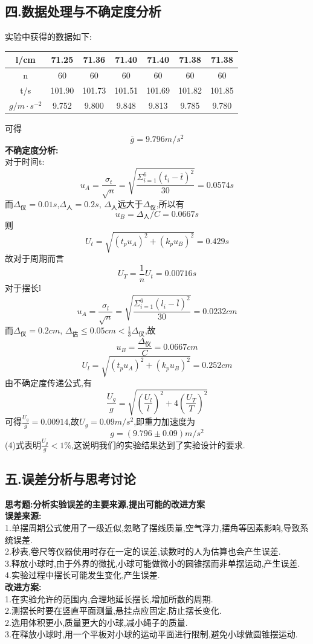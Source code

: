 \documentclass[12pt,a4paper,oneside]{ctexart}
\begin{document}
\subsection*{四.数据处理与不确定度分析}
实验中获得的数据如下:
\begin{center}
    \begin{tabular}{|c|c|c|c|c|c|c|}
    \hline
    l/cm&71.25&71.36&71.40&71.40&71.38&71.38\\
    \hline
    n&60&60&60&60&60&60\\
    \hline
    t/s&101.90&101.73&101.51&101.69&101.82&101.85\\
    \hline
    $g/m\cdot s^{-2}$& 9.752&9.800&9.848&9.813&9.785&9.780\\
    \hline
    \end{tabular}
\end{center}
可得$$\overline{g}=9.796m/s^2$$
\textbf{不确定度分析:}\\
对于时间t:
$$u_A=\frac{\sigma_t}{\sqrt{n}}
=\sqrt{\frac{\Sigma_{i=1}^6(t_i-\overline{t})^2}{30}}=0.0574s$$
而$\Delta_{\mbox{仪}}=0.01s$,$\Delta_{\mbox{人}}=0.2s$,
$\Delta_{\mbox{人}}$远大于$\Delta_{\mbox{仪}}$,所以有
$$u_B=\Delta_{\mbox{人}}/C=0.0667s$$
则$$U_t=\sqrt{(t_pu_A)^2+(k_pu_B)^2}=0.429s$$
故对于周期而言$$U_T=\frac{1}{n}U_t=0.00716s$$
对于摆长l
$$u_A=\frac{\sigma_l}{\sqrt{n}}
=\sqrt{\frac{\Sigma_{i=1}^6(l_i-\overline{l})^2}{30}}=0.0232cm$$
而$\Delta_{\mbox{仪}}=0.2cm$,
$\Delta_{\mbox{估}}\leqslant 0.05cm<\frac{1}{3}\Delta_{\mbox{仪}}$,故
$$u_B=\dfrac{\Delta_{\mbox{仪}}}{C}=0.0667cm$$
$$U_l=\sqrt{(t_pu_A)^2+(k_pu_B)^2}=0.252cm$$
由不确定度传递公式,有
\begin{equation}
    \frac{U_g}{g}=
    \sqrt{\left(\frac{U_l}{l}\right)^2+4\left(\frac{U_T}{T}\right)^2}
\end{equation}
可得$\frac{U_g}{g}=0.00914$,故$U_g=0.09m/s^2$,即重力加速度为
$$g=(9.796\pm0.09)m/s^2$$
(4)式表明$\frac{U_g}{g}<1\%$,这说明我们的实验结果达到了实验设计的要求.
\subsection*{五.误差分析与思考讨论}\noindent
\textbf{思考题:分析实验误差的主要来源,提出可能的改进方案}\\
\textbf{误差来源:}\\
1.单摆周期公式使用了一级近似,忽略了摆线质量,空气浮力,摆角等因素影响,导致系统误差.\\
2.秒表,卷尺等仪器使用时存在一定的误差,读数时的人为估算也会产生误差.\\
3.释放小球时,由于外界的微扰,小球可能做微小的圆锥摆而非单摆运动,产生误差.\\
4.实验过程中摆长可能发生变化,产生误差.\\
\textbf{改进方案:}\\
1.在实验允许的范围内,合理地延长摆长,增加所数的周期.\\
2.测摆长时要在竖直平面测量,悬挂点应固定,防止摆长变化.\\
2.选用体积更小,质量更大的小球,减小绳子的质量.\\
3.在释放小球时,用一个平板对小球的运动平面进行限制,避免小球做圆锥摆运动.
\end{document}
